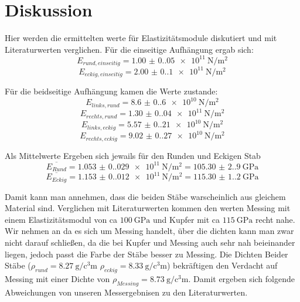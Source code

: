\section{Diskussion}
\label{sec:Diskussion}
Hier werden die ermittelten werte für Elastizitätsmodule diskutiert und mit Literaturwerten verglichen.
Für die einseitige Aufhängung ergab sich:
\begin{equation*}
    E_{rund,einseitig} = \qty{1.00(0.05)e11}{\newton\per\meter\squared}
  \end{equation*}
\begin{equation*}
    E_{eckig,einseitig} = \qty{2.00(0.1)e11}{\newton\per\meter\squared}
\end{equation*}

Für die beidseitige Aufhängung kamen die Werte zustande:
\begin{equation*}
    E_{links,rund} = \qty{8.6(0.6)e10}{\newton\per\meter\squared}
  \end{equation*}
\begin{equation*}
    E_{rechts,rund} = \qty{1.30(0.04)e11}{\newton\per\meter\squared}
\end{equation*}
\begin{equation*}
    E_{links,eckig} = \qty{5.57(0.21)e10}{\newton\per\meter\squared}
\end{equation*}
\begin{equation*}
    E_{rechts,eckig} = \qty{9.02(0.27)e10}{\newton\per\meter\squared}
\end{equation*}

Als Mittelwerte Ergeben sich jewails für den Runden und Eckigen Stab
\begin{equation*}
    \overline{E_{Rund}} = \qty{1.053(0.029)e11}{\newton\per\meter\squared} = \qty{105.30(2.90)}{\giga\pascal}
\end{equation*}
\begin{equation*}
    \overline{E_{Eckig}} = \qty{1.153(0.012)e11}{\newton\per\meter\squared} = \qty{115.30(1.20)}{\giga\pascal}
\end{equation*}

Damit kann man annehmen, dass die beiden Stäbe warscheinlich aus gleichem Material sind. 
Verglichen mit Literaturwerten kommen den werten Messing mit einem Elastizitätsmodul von 
ca $\qty{100}{\giga\pascal}$ und Kupfer mit ca $\qty{115}{\giga\pascal}$ recht nahe. Wir 
nehmen an da es sich um Messing handelt, über die dichten kann man zwar nicht darauf schließen, 
da die bei Kupfer und Messing auch sehr nah beieinander liegen, jedoch passt die Farbe der Stäbe 
besser zu Messing. Die Dichten Beider Stäbe ($\rho_{rund} = \qty{8.27}{\gram\per\cubic\centi\meter}$
$\rho_{eckig} = \qty{8.33}{\gram\per\cubic\centi\meter}$) bekräftigen den Verdacht auf Messing mit 
einer Dichte von $\rho_{Messing} = \qty{8.73}{\gram\per\cubic\centi\meter}$. Damit ergeben sich folgende 
Abweichungen von unseren Messergebnisen zu den Literaturwerten.

